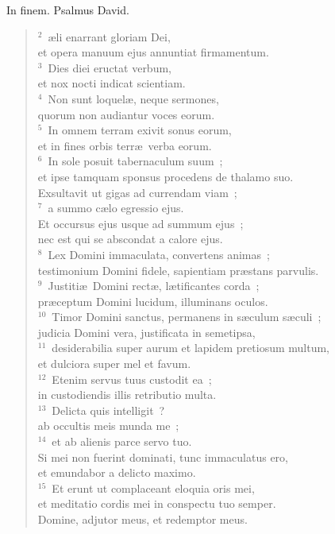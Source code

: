 \bchapter[Psalm]
In finem. Psalmus David.
\begin{verse}${}^{2}$~\ae li enarrant gloriam Dei,\\ et opera manuum ejus annuntiat firmamentum.\\
${}^{3}$~Dies diei eructat verbum,\\ et nox nocti indicat scientiam.\\
${}^{4}$~Non sunt loquel\ae , neque sermones,\\ quorum non audiantur voces eorum.\\
${}^{5}$~In omnem terram exivit sonus eorum,\\ et in fines orbis terr\ae\ verba eorum.\\
${}^{6}$~In sole posuit tabernaculum suum~;\\ et ipse tamquam sponsus procedens de thalamo suo.\\ Exsultavit ut gigas ad currendam viam~;\\
${}^{7}$~a summo c\ae lo egressio ejus.\\ Et occursus ejus usque ad summum ejus~;\\ nec est qui se abscondat a calore ejus.\\
${}^{8}$~Lex Domini immaculata, convertens animas~;\\ testimonium Domini fidele, sapientiam pr\ae stans parvulis.\\
${}^{9}$~Justiti\ae\ Domini rect\ae , l\ae tificantes corda~;\\ pr\ae ceptum Domini lucidum, illuminans oculos.\\
${}^{10}$~Timor Domini sanctus, permanens in s\ae culum s\ae culi~;\\ judicia Domini vera, justificata in semetipsa,\\
${}^{11}$~desiderabilia super aurum et lapidem pretiosum multum,\\ et dulciora super mel et favum.\\
${}^{12}$~Etenim servus tuus custodit ea~;\\ in custodiendis illis retributio multa.\\
${}^{13}$~Delicta quis intelligit~?\\ ab occultis meis munda me~;\\
${}^{14}$~et ab alienis parce servo tuo.\\ Si mei non fuerint dominati, tunc immaculatus ero,\\ et emundabor a delicto maximo.\\
${}^{15}$~Et erunt ut complaceant eloquia oris mei,\\ et meditatio cordis mei in conspectu tuo semper.\\ Domine, adjutor meus, et redemptor meus.\end{verse}




